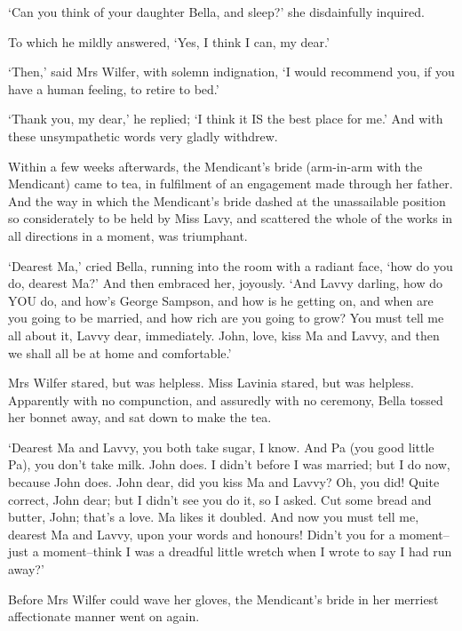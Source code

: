 ‘Can you think of your daughter Bella, and sleep?’ she disdainfully
inquired.

To which he mildly answered, ‘Yes, I think I can, my dear.’

‘Then,’ said Mrs Wilfer, with solemn indignation, ‘I would recommend
you, if you have a human feeling, to retire to bed.’

‘Thank you, my dear,’ he replied; ‘I think it IS the best place for me.’
And with these unsympathetic words very gladly withdrew.

Within a few weeks afterwards, the Mendicant’s bride (arm-in-arm with
the Mendicant) came to tea, in fulfilment of an engagement made through
her father. And the way in which the Mendicant’s bride dashed at the
unassailable position so considerately to be held by Miss Lavy, and
scattered the whole of the works in all directions in a moment, was
triumphant.

‘Dearest Ma,’ cried Bella, running into the room with a radiant face,
‘how do you do, dearest Ma?’ And then embraced her, joyously. ‘And Lavvy
darling, how do YOU do, and how’s George Sampson, and how is he getting
on, and when are you going to be married, and how rich are you going
to grow? You must tell me all about it, Lavvy dear, immediately.
John, love, kiss Ma and Lavvy, and then we shall all be at home and
comfortable.’

Mrs Wilfer stared, but was helpless. Miss Lavinia stared, but was
helpless. Apparently with no compunction, and assuredly with no
ceremony, Bella tossed her bonnet away, and sat down to make the tea.

‘Dearest Ma and Lavvy, you both take sugar, I know. And Pa (you good
little Pa), you don’t take milk. John does. I didn’t before I was
married; but I do now, because John does. John dear, did you kiss Ma and
Lavvy? Oh, you did! Quite correct, John dear; but I didn’t see you do
it, so I asked. Cut some bread and butter, John; that’s a love. Ma likes
it doubled. And now you must tell me, dearest Ma and Lavvy, upon your
words and honours! Didn’t you for a moment--just a moment--think I was a
dreadful little wretch when I wrote to say I had run away?’

Before Mrs Wilfer could wave her gloves, the Mendicant’s bride in her
merriest affectionate manner went on again.

